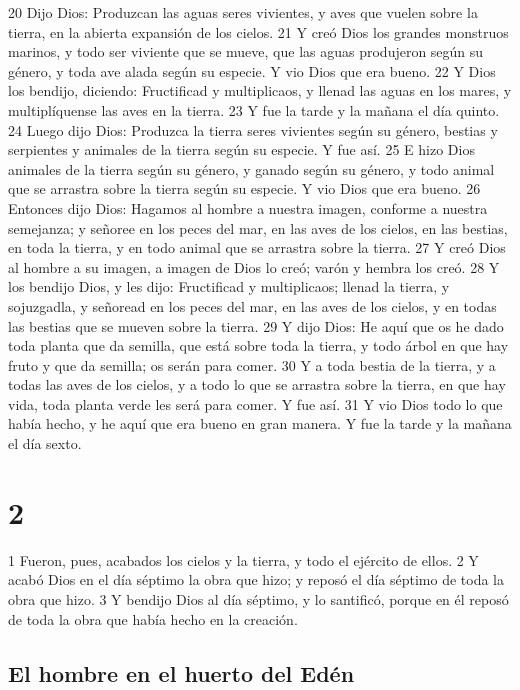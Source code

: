 20 Dijo Dios: Produzcan las aguas seres vivientes, y aves que vuelen sobre la tierra, en la abierta expansión de los cielos.
21 Y creó Dios los grandes monstruos marinos, y todo ser viviente que se mueve, que las aguas produjeron según su género, y toda ave alada según su especie. Y vio Dios que era bueno.
22 Y Dios los bendijo, diciendo: Fructificad y multiplicaos, y llenad las aguas en los mares, y multiplíquense las aves en la tierra.
23 Y fue la tarde y la mañana el día quinto.
24 Luego dijo Dios: Produzca la tierra seres vivientes según su género, bestias y serpientes y animales de la tierra según su especie. Y fue así.
25 E hizo Dios animales de la tierra según su género, y ganado según su género, y todo animal que se arrastra sobre la tierra según su especie. Y vio Dios que era bueno.
26 Entonces dijo Dios: Hagamos al hombre a nuestra imagen, conforme a nuestra semejanza; y señoree en los peces del mar, en las aves de los cielos, en las bestias, en toda la tierra, y en todo animal que se arrastra sobre la tierra.
27 Y creó Dios al hombre a su imagen, a imagen de Dios lo creó; varón y hembra los creó.
28 Y los bendijo Dios, y les dijo: Fructificad y multiplicaos; llenad la tierra, y sojuzgadla, y señoread en los peces del mar, en las aves de los cielos, y en todas las bestias que se mueven sobre la tierra.
29 Y dijo Dios: He aquí que os he dado toda planta que da semilla, que está sobre toda la tierra, y todo árbol en que hay fruto y que da semilla; os serán para comer.
30 Y a toda bestia de la tierra, y a todas las aves de los cielos, y a todo lo que se arrastra sobre la tierra, en que hay vida, toda planta verde les será para comer. Y fue así.
31 Y vio Dios todo lo que había hecho, y he aquí que era bueno en gran manera. Y fue la tarde y la mañana el día sexto.

\chapter{2}

1 Fueron, pues, acabados los cielos y la tierra, y todo el ejército de ellos.
2 Y acabó Dios en el día séptimo la obra que hizo; y reposó el día séptimo de toda la obra que hizo.
3 Y bendijo Dios al día séptimo, y lo santificó, porque en él reposó de toda la obra que había hecho en la creación.

\section*{El hombre en el huerto del Edén}

